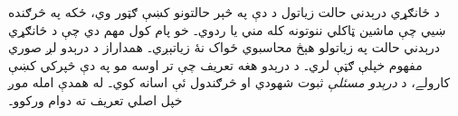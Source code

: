 \documentclass[../../../include/open-logic-section]{subfiles}
\begin{document}
\begin{explain}
د ځانګړي درېدني حالت زياتول د دې په څېر حالتونو کښې ګټور وي، ځکه په
څرګنده ښيي چې ماشين ټاکلي ننوتونه کله مني يا ردوي۔ خو پام کول مهم دي
چې د ځانګړي درېدني حالت په زياتولو هېڅ محاسبوي ځواک نۀ زياتېږي۔ همداراز
د درېدو لږ صوري مفهوم خپلې ګټې لري۔ د درېدو هغه تعريف چې تر اوسه مو
په دې څپرکي کښې کارولے، د \emph{درېدو مسئلې} ثبوت شهودي او څرګندول ئې
اسانه کوي۔ له همدې امله موږ خپل اصلي تعريف ته دوام ورکوو۔
\end{explain}
\end{document}
